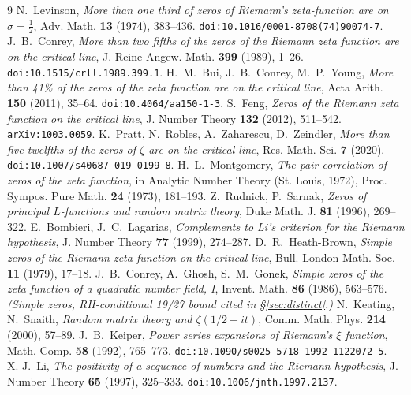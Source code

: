 \documentclass[11pt]{article}
\theoremstyle{remark}
\begin{document}
\begin{thebibliography}{9}
 N.~Levinson, \emph{More than one third of zeros of Riemann's zeta-function are on $\sigma=\frac12$}, Adv. Math. \textbf{13} (1974), 383--436. \texttt{doi:10.1016/0001-8708(74)90074-7}.
 J.~B.~Conrey, \emph{More than two fifths of the zeros of the Riemann zeta function are on the critical line}, J. Reine Angew. Math. \textbf{399} (1989), 1--26. \texttt{doi:10.1515/crll.1989.399.1}.
 H.~M.~Bui, J.~B.~Conrey, M.~P.~Young, \emph{More than 41\% of the zeros of the zeta function are on the critical line}, Acta Arith. \textbf{150} (2011), 35--64. \texttt{doi:10.4064/aa150-1-3}.
 S.~Feng, \emph{Zeros of the Riemann zeta function on the critical line}, J. Number Theory \textbf{132} (2012), 511--542. \texttt{arXiv:1003.0059}.
 K.~Pratt, N.~Robles, A.~Zaharescu, D.~Zeindler, \emph{More than five-twelfths of the zeros of $\zeta$ are on the critical line}, Res. Math. Sci. \textbf{7} (2020). \texttt{doi:10.1007/s40687-019-0199-8}.
 H.~L.~Montgomery, \emph{The pair correlation of zeros of the zeta function}, in Analytic Number Theory (St. Louis, 1972), Proc. Sympos. Pure Math. \textbf{24} (1973), 181--193.
 Z.~Rudnick, P.~Sarnak, \emph{Zeros of principal $L$-functions and random matrix theory}, Duke Math. J. \textbf{81} (1996), 269--322.
 E.~Bombieri, J.~C.~Lagarias, \emph{Complements to Li's criterion for the Riemann hypothesis}, J. Number Theory \textbf{77} (1999), 274--287.
 D.~R.~Heath-Brown, \emph{Simple zeros of the Riemann zeta-function on the critical line}, Bull. London Math. Soc. \textbf{11} (1979), 17--18.
 J.~B.~Conrey, A.~Ghosh, S.~M.~Gonek, \emph{Simple zeros of the zeta function of a quadratic number field, I}, Invent. Math. \textbf{86} (1986), 563--576. \emph{(Simple zeros, RH-conditional 19/27 bound cited in \S\ref{sec:distinct}.)}
 N.~Keating, N.~Snaith, \emph{Random matrix theory and $\zeta(1/2+it)$}, Comm. Math. Phys. \textbf{214} (2000), 57--89.
 J.~B.~Keiper, \emph{Power series expansions of Riemann's $\xi$ function}, Math. Comp. \textbf{58} (1992), 765--773. \texttt{doi:10.1090/s0025-5718-1992-1122072-5}.
 X.-J.~Li, \emph{The positivity of a sequence of numbers and the Riemann hypothesis}, J. Number Theory \textbf{65} (1997), 325--333. \texttt{doi:10.1006/jnth.1997.2137}.
\end{thebibliography}
\end{document}
